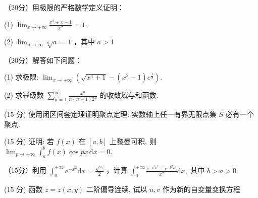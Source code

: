 \par{}
（20分）用极限的严格数学定义证明：\par
(1) $\lim_{x\to +\infty}\frac{x^2 + x - 1}{x^2} = 1.$\par
(2) $\lim_{n\to \infty}\sqrt[n]{a} = 1$ ，其中 $a > 1$\par
\par{}
（20分）解答如下问题：\par
(1) 求极限: $\lim_{x \to +\infty} \left( \sqrt{x^4 + 1} - (x^2 - 1)e^{\frac{1}{x}} \right)$.\par
(2) 求幂级数 $\sum_{n=1}^{\infty} \frac{x^n}{n(n+1)2^n}$ 的收敛域与和函数.\par
\par{}
(15 分) 使用闭区间套定理证明聚点定理: 实数轴上任一有界无限点集 $S$ 必有一个聚点.\par
\par{}
(15 分) 证明: 若 $f(x)$ 在 $[a, b]$ 上黎曼可积, 则 $\lim_{p \to +\infty} \int_{a}^{b} f(x) \cos px \, \mathrm{d}x = 0$.\par
\par{}
（15分）利用 $\int_0^{+\infty}e^{-x^2}\mathrm{d}x = \frac{\sqrt{\pi}}{2}$ ，计算 $\int_0^{+\infty}\frac{e^{-a^2x^2} - e^{-b^2x^2}}{x^2}\mathrm{d}x,$ 其中 $b > a > 0.$\par
\par{}
\par{}
(15 分) 函数 $z = z(x, y)$ 二阶偏导连续, 试以 $u, v$ 作为新的自变量变换方程\par
\nopagebreak[4]
